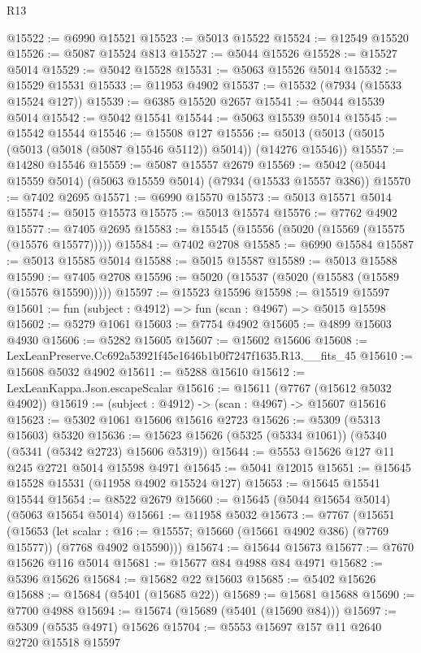 \begin{lexlean}{R13}
\begin{coremodule}
@15522 := @6990 @15521
@15523 := @5013 @15522
@15524 := @12549 @15520
@15526 := @5087 @15524 @813
@15527 := @5044 @15526
@15528 := @15527 @5014
@15529 := @5042 @15528
@15531 := @5063 @15526 @5014
@15532 := @15529 @15531
@15533 := @11953 @4902
@15537 := @15532 (@7934 (@15533 @15524 @127))
@15539 := @6385 @15520 @2657
@15541 := @5044 @15539 @5014
@15542 := @5042 @15541
@15544 := @5063 @15539 @5014
@15545 := @15542 @15544
@15546 := @15508 @127
@15556 := @5013 (@5013 (@5015 (@5013 (@5018 (@5087 @15546 @5112)) @5014)) (@14276 @15546))
@15557 := @14280 @15546
@15559 := @5087 @15557 @2679
@15569 := @5042 (@5044 @15559 @5014) (@5063 @15559 @5014) (@7934 (@15533 @15557 @386))
@15570 := @7402 @2695
@15571 := @6990 @15570
@15573 := @5013 @15571 @5014
@15574 := @5015 @15573
@15575 := @5013 @15574
@15576 := @7762 @4902
@15577 := @7405 @2695
@15583 := @15545 (@15556 (@5020 (@15569 (@15575 (@15576 @15577)))))
@15584 := @7402 @2708
@15585 := @6990 @15584
@15587 := @5013 @15585 @5014
@15588 := @5015 @15587
@15589 := @5013 @15588
@15590 := @7405 @2708
@15596 := @5020 (@15537 (@5020 (@15583 (@15589 (@15576 @15590)))))
@15597 := @15523 @15596
@15598 := @15519 @15597
@15601 := fun (subject : @4912) => fun (scan : @4967) => @5015 @15598
@15602 := @5279 @1061
@15603 := @7754 @4902
@15605 := @4899 @15603 @4930
@15606 := @5282 @15605
@15607 := @15602 @15606
@15608 := LexLeanPreserve.Cc692a53921f45e1646b1b0f7247f1635.R13.__fits_45
@15610 := @15608 @5032 @4902
@15611 := @5288 @15610
@15612 := LexLeanKappa.Json.escapeScalar
@15616 := @15611 (@7767 (@15612 @5032 @4902))
@15619 := (subject : @4912) -> (scan : @4967) -> @15607 @15616
@15623 := @5302 @1061 @15606 @15616 @2723
@15626 := @5309 (@5313 @15603) @5320
@15636 := @15623 @15626 (@5325 (@5334 @1061)) (@5340 (@5341 (@5342 @2723) @15606 @5319))
@15644 := @5553 @15626 @127 @11 @245 @2721 @5014 @15598 @4971
@15645 := @5041 @12015
@15651 := @15645 @15528 @15531 (@11958 @4902 @15524 @127)
@15653 := @15645 @15541 @15544
@15654 := @8522 @2679
@15660 := @15645 (@5044 @15654 @5014) (@5063 @15654 @5014)
@15661 := @11958 @5032
@15673 := @7767
    (@15651
      (@15653
        (let scalar : @16 := @15557; @15660 (@15661 @4902 @386) (@7769 @15577))
        (@7768 @4902 @15590)))
@15674 := @15644 @15673
@15677 := @7670 @15626 @116 @5014
@15681 := @15677 @84 @4988 @84 @4971
@15682 := @5396 @15626
@15684 := @15682 @22 @15603
@15685 := @5402 @15626
@15688 := @15684 (@5401 (@15685 @22))
@15689 := @15681 @15688
@15690 := @7700 @4988
@15694 := @15674 (@15689 (@5401 (@15690 @84)))
@15697 := @5309 (@5535 @4971) @15626
@15704 := @5553 @15697 @157 @11 @2640 @2720 @15518 @15597

\end{coremodule}
\end{lexlean}
